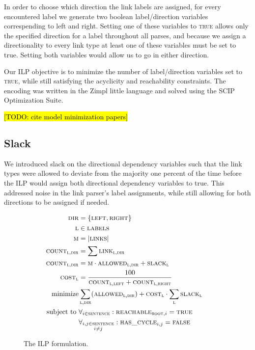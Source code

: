\documentclass[11pt]{article}
\newcommand{\Note}[1]{}
\renewcommand{\Note}[1]{\hl{[#1]}}  %
\newcommand{\TODO}[1]{\Note{TODO: #1}}
\begin{document}
In order to choose which direction the link labels are assigned, for every encountered label we generate two boolean label/direction variables correspending to left and right. Setting one of these variables to \textsc{true} allows only the specified direction for a label throughout all parses, and because we assign a directionality to every link type at least one of these variables must be set to true. Setting both variables would allow us to go in either direction.

Our ILP objective is to minimize the number of label/direction variables set to \textsc{true}, while still satisfying the acyclicity and reachability constraints. The encoding was written in the Zimpl little language \cite{Koch2004} and solved using the SCIP Optimization Suite\cite{achterberg2009scip}.

\TODO{cite model minimization papers}

\subsection{Slack}
We introduced slack on the directional dependency variables such that the link types were allowed to deviate from the majority one percent of the time before the ILP would assign both directional dependency variables to true. This addressed noise in the link parser's label assignments, while still allowing for both directions to be assigned if needed.
\begin{figure}
  \small
  \begin{align}
    \textsc{dir} &= \{\textsc{left}, \textsc{right}\} &\\ 
    \textsc{l} &\in \textsc{labels} & \\
    \textsc{m} &= \left|{\textsc{links}}\right| &\\
    \textsc{count}_{\textsc{l}, \textsc{dir}} &= \sum \textsc{link}_{\textsc{l},\textsc{dir}} &\\
    \textsc{count}_{\textsc{l}, \textsc{dir}} &= \textsc{m} \cdot \textsc{allowed}_{\textsc{l},\textsc{dir}} + \textsc{slack}_{\textsc{l}} &\\
    \textsc{cost}_{\textsc{l}} &= \frac{100}{\textsc{count}_{\textsc{l},\textsc{left}} + \textsc{count}_{\textsc{l},\textsc{right}}} &\\
    \text{minimize} &\sum_{\textsc{l}, \textsc{dir}} (\textsc{allowed}_{\textsc{l},\textsc{dir}}) + \textsc{cost}_{\textsc{l}} \cdot \sum_\textsc{l} \textsc{slack}_{\textsc{l}} &\\
    \text{subject to } &\forall_{i \in \textsc{sentence}}: \textsc{reachable}_{\textsc{root}, i} = \textsc{true} &\\
                       &\forall_{\substack{i,j \in \textsc{sentence} \\ i\neq j }}: \textsc{has\_cycle}_{i,j} = \textsc{false} &
  \end{align}
  \caption{\small The ILP formulation.}
\end{figure}
\end{document}
